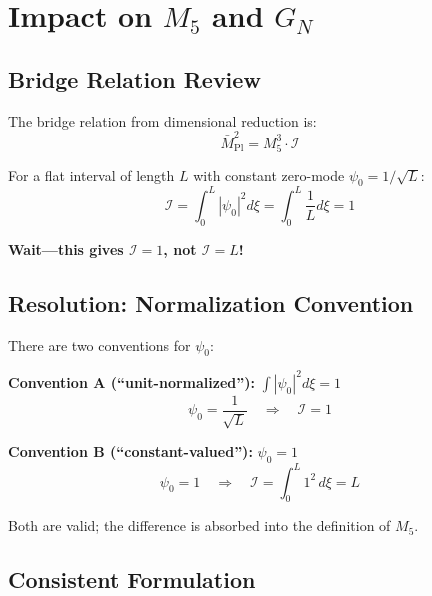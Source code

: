 \documentclass[11pt,a4paper]{article}
\newcommand{\Mplbar}{\bar{M}_{\mathrm{Pl}}}
\newcommand{\Mfive}{M_5}
\newcommand{\calI}{\mathcal{I}}
\newcommand{\GN}{G_N}
\begin{document}
\section{Impact on $\Mfive$ and $\GN$}

\subsection{Bridge Relation Review}

The bridge relation from dimensional reduction is:
\begin{equation}
\Mplbar^2 = \Mfive^3 \cdot \calI
\label{eq:bridge}
\end{equation}

For a flat interval of length $L$ with constant zero-mode $\psi_0 = 1/\sqrt{L}$:
\begin{equation}
\calI = \int_0^L |\psi_0|^2 d\xi = \int_0^L \frac{1}{L} d\xi = 1
\label{eq:I-normalized}
\end{equation}

\textbf{Wait---this gives $\calI = 1$, not $\calI = L$!}

\subsection{Resolution: Normalization Convention}

There are two conventions for $\psi_0$:

\textbf{Convention A (``unit-normalized''):} $\int |\psi_0|^2 d\xi = 1$
\begin{equation}
\psi_0 = \frac{1}{\sqrt{L}} \quad \Rightarrow \quad \calI = 1
\label{eq:psi0-unit}
\end{equation}

\textbf{Convention B (``constant-valued''):} $\psi_0 = 1$
\begin{equation}
\psi_0 = 1 \quad \Rightarrow \quad \calI = \int_0^L 1^2 \, d\xi = L
\label{eq:psi0-const}
\end{equation}

Both are valid; the difference is absorbed into the definition of $\Mfive$.

\subsection{Consistent Formulation}
\end{document}
